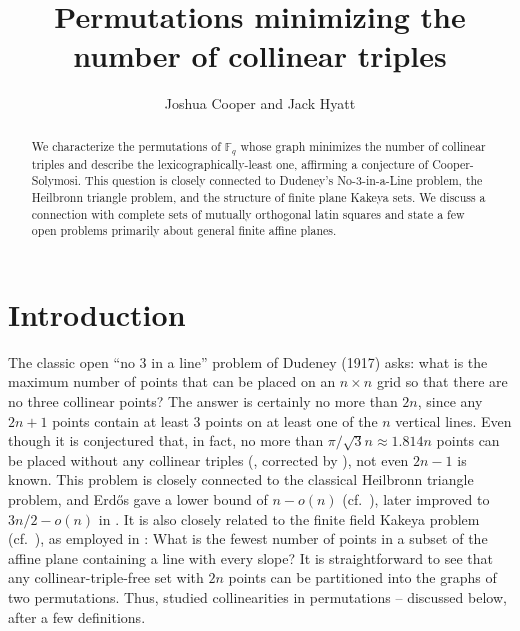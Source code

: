 \documentclass[12pt]{article}
\begin{document}
 
%
%
 
\title{Permutations minimizing the number of collinear triples} 
\author{Joshua Cooper and Jack Hyatt}
\maketitle

\begin{abstract}
    We characterize the permutations of $\mathbb{F}_q$ whose graph minimizes the number of collinear triples and describe the lexicographically-least one, affirming a conjecture of Cooper-Solymosi.  This question is closely connected to Dudeney's No-3-in-a-Line problem, the Heilbronn triangle problem, and the structure of finite plane Kakeya sets.  We discuss a connection with complete sets of mutually orthogonal latin squares and state a few open problems primarily about general finite affine planes.
\end{abstract}

\section{Introduction}

The classic open ``no $3$ in a line'' problem of Dudeney (1917) asks: what is the maximum number of points that can be placed on an $n \times n$ grid so that there are no three collinear points?  The answer is certainly no more than $2n$, since any $2n+1$ points contain at least $3$ points on at least one of the $n$ vertical lines.  Even though it is conjectured that, in fact, no more than $\pi/\sqrt{3} n \approx 1.814 n$ points can be placed without any collinear triples (\cite{guy}, corrected by \cite{pegg}), not even $2n-1$ is known.  This problem is closely connected to the classical Heilbronn triangle problem, and Erd\H{o}s gave a lower bound of $n-o(n)$ (cf.~\cite{roth}), later improved to $3n/2-o(n)$ in \cite{hall}.  It is also closely related to the finite field Kakeya problem (cf.~\cite{blokhuis}), as employed in \cite{li}: What is the fewest number of points in a subset of the affine plane containing a line with every slope?  It is straightforward to see that any collinear-triple-free set with $2n$ points can be partitioned into the graphs of two permutations.  Thus, \cite{cooper} studied collinearities in permutations -- discussed below, after a few definitions.
\end{document}
